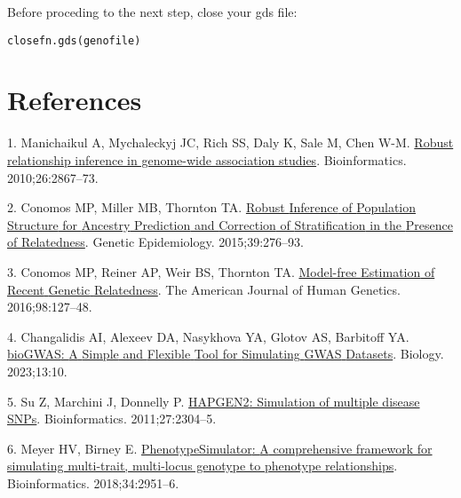 \documentclass[
]{book}
\newlength{\cslhangindent}
\newlength{\cslentryspacingunit} %
\newenvironment{CSLReferences}[2] %
 {%
  \setlength{\parindent}{0pt}
  \ifodd #1
  \let\oldpar\par
  \def\par{\hangindent=\cslhangindent\oldpar}
  \fi
  \setlength{\parskip}{#2\cslentryspacingunit}
 }%
 {}
\begin{document}
Before proceding to the next step, close your gds file:

\begin{verbatim}
closefn.gds(genofile)
\end{verbatim}

\hypertarget{references}{%
\chapter{References}\label{references}}

\hypertarget{refs}{}
\begin{CSLReferences}{0}{0}
\leavevmode{}%
1. Manichaikul A, Mychaleckyj JC, Rich SS, Daly K, Sale M, Chen W-M. \href{https://doi.org/10.1093/bioinformatics/btq559}{Robust relationship inference in genome-wide association studies}. Bioinformatics. 2010;26:2867--73.

\leavevmode{}%
2. Conomos MP, Miller MB, Thornton TA. \href{https://doi.org/10.1002/gepi.21896}{Robust {Inference} of {Population} {Structure} for {Ancestry} {Prediction} and {Correction} of {Stratification} in the {Presence} of {Relatedness}}. Genetic Epidemiology. 2015;39:276--93.

\leavevmode{}%
3. Conomos MP, Reiner AP, Weir BS, Thornton TA. \href{https://doi.org/10.1016/j.ajhg.2015.11.022}{Model-free {Estimation} of {Recent} {Genetic} {Relatedness}}. The American Journal of Human Genetics. 2016;98:127--48.

\leavevmode{}%
4. Changalidis AI, Alexeev DA, Nasykhova YA, Glotov AS, Barbitoff YA. \href{https://doi.org/10.3390/biology13010010}{{bioGWAS}: {A} {Simple} and {Flexible} {Tool} for {Simulating} {GWAS} {Datasets}}. Biology. 2023;13:10.

\leavevmode{}%
5. Su Z, Marchini J, Donnelly P. \href{https://doi.org/10.1093/bioinformatics/btr341}{{HAPGEN2}: Simulation of multiple disease {SNPs}}. Bioinformatics. 2011;27:2304--5.

\leavevmode{}%
6. Meyer HV, Birney E. \href{https://doi.org/10.1093/bioinformatics/bty197}{{PhenotypeSimulator}: {A} comprehensive framework for simulating multi-trait, multi-locus genotype to phenotype relationships}. Bioinformatics. 2018;34:2951--6.


\end{CSLReferences}
\end{document}

